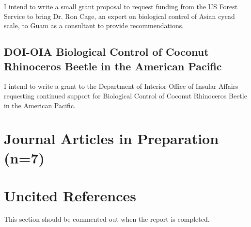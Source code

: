 I intend to write a small grant proposal to request funding from the US Forest Service to bring Dr. Ron Cage, an expert on biological control of Asian cycad scale, to Guam as a consultant to provide recommendations.

\subsection{DOI-OIA Biological Control of Coconut Rhinoceros Beetle in the American Pacific}
\label{doi2}

I intend to write a grant to the Department of Interior Office of Insular Affairs requesting continued support for Biological Control of Coconut Rhinoceros Beetle in the American Pacific.

\pagebreak

\section{Journal Articles in Preparation (n=7)}
\begin{refsection}
	
\cite{moore_first_nodate-1,moore_mariana_2013,moore_three_nodate-1,moore_change_nodate,moore_aubrey_crb_nodate,marshall_recent_nodate,moore_coconut_nodate-1}

\printbibliography[heading=none]
\end{refsection}

\section{Uncited References}
This section should be commented out when the report is completed.
\printbibliography[heading=none, notcategory=cited]


